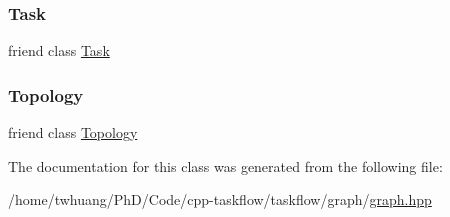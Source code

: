 \subsubsection{\texorpdfstring{Task}{Task}}
{\footnotesize\ttfamily friend class \hyperlink{classtf_1_1Task}{Task}\hspace{0.3cm}{\ttfamily [friend]}}

\mbox{\label{classtf_1_1Node_acd2b8699ab7559c0da687cd775e2c778}} 
\subsubsection{\texorpdfstring{Topology}{Topology}}
{\footnotesize\ttfamily friend class \hyperlink{classtf_1_1Topology}{Topology}\hspace{0.3cm}{\ttfamily [friend]}}



The documentation for this class was generated from the following file\+:\begin{DoxyCompactItemize}
\item 
/home/twhuang/\+Ph\+D/\+Code/cpp-\/taskflow/taskflow/graph/\hyperlink{graph_8hpp}{graph.\+hpp}\end{DoxyCompactItemize}
